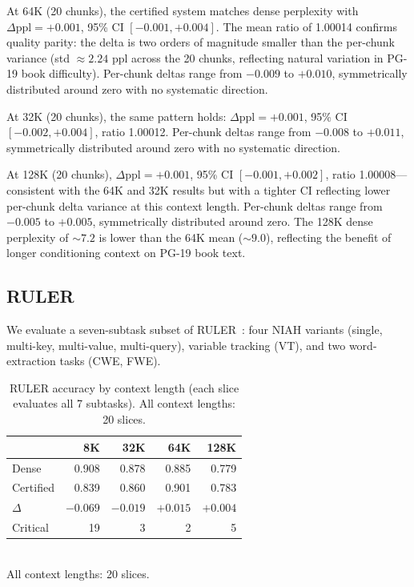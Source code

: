 \documentclass[10pt,twocolumn,a4paper]{article}
\theoremstyle{definition}
\theoremstyle{remark}
\begin{document}
At 64K (20 chunks), the certified system matches dense perplexity with $\Delta\mathrm{ppl}{=}{+}0.001$, 95\% CI $[-0.001, +0.004]$.  The mean ratio of 1.00014 confirms quality parity: the delta is two orders of magnitude smaller than the per-chunk variance (std $\approx 2.24$ ppl across the 20 chunks, reflecting natural variation in PG-19 book difficulty).  Per-chunk deltas range from $-0.009$ to $+0.010$, symmetrically distributed around zero with no systematic direction.

At 32K (20 chunks), the same pattern holds: $\Delta\mathrm{ppl}{=}{+}0.001$, 95\% CI $[-0.002, +0.004]$, ratio 1.00012.  Per-chunk deltas range from $-0.008$ to $+0.011$, symmetrically distributed around zero with no systematic direction.

At 128K (20 chunks), $\Delta\mathrm{ppl}{=}{+}0.001$, 95\% CI $[-0.001, +0.002]$, ratio 1.00008---consistent with the 64K and 32K results but with a tighter CI reflecting lower per-chunk delta variance at this context length.  Per-chunk deltas range from $-0.005$ to $+0.005$, symmetrically distributed around zero.  The 128K dense perplexity of ${\sim}7.2$ is lower than the 64K mean (${\sim}9.0$), reflecting the benefit of longer conditioning context on PG-19 book text.

\subsection{RULER}

We evaluate a seven-subtask subset of RULER~\cite{ruler}: four NIAH variants (single, multi-key, multi-value, multi-query), variable tracking (VT), and two word-extraction tasks (CWE, FWE).

\begin{table}[ht]
\centering
\caption{RULER accuracy by context length (each slice evaluates all 7 subtasks).  All context lengths: 20 slices.}
\label{tab:ruler}
\footnotesize
\begin{tabular}{lrrrr}
\toprule
& \textbf{8K} & \textbf{32K} & \textbf{64K} & \textbf{128K} \\
\midrule
Dense     & 0.908 & 0.878 & 0.885 & 0.779 \\
Certified & 0.839 & 0.860 & 0.901 & 0.783 \\
$\Delta$  & $-0.069$ & $-0.019$ & $+0.015$ & $+0.004$ \\
Critical  & 19 & 3 & 2 & 5 \\
\bottomrule
\end{tabular}
\\[2pt]
{\scriptsize All context lengths: 20 slices.}
\end{table}
\end{document}
